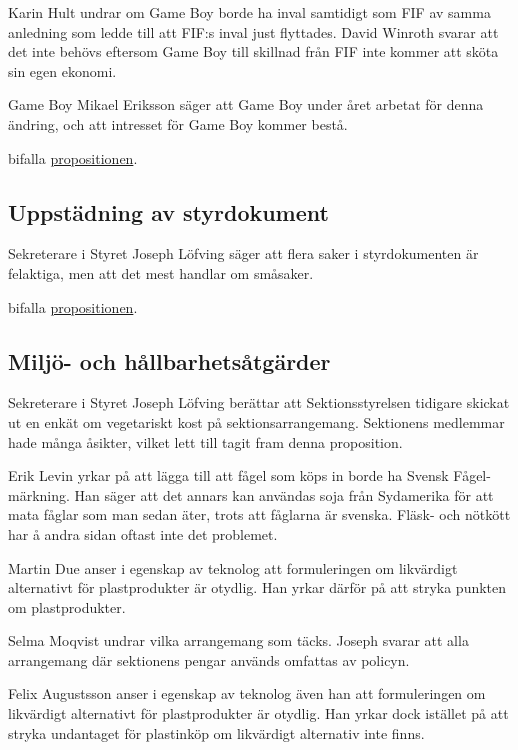 \documentclass[hidelinks]{sektionsmote}
\begin{document}
Karin Hult undrar om Game Boy borde ha inval samtidigt som FIF av samma anledning som ledde till att FIF:s inval just flyttades.
David Winroth svarar att det inte behövs eftersom Game Boy till skillnad från FIF inte kommer att sköta sin egen ekonomi.

Game Boy Mikael Eriksson säger att Game Boy under året arbetat för denna ändring, och att intresset för Game Boy kommer bestå.

\begin{beslut}
  \item bifalla \hyperlink{bilagor/prop/b.pdf.1}{propositionen}.
\end{beslut}


\subsection{Uppstädning av styrdokument}
Sekreterare i Styret Joseph Löfving säger att flera saker i styrdokumenten är felaktiga, men att det mest handlar om småsaker.

\begin{beslut}
  \item bifalla \hyperlink{bilagor/prop/c.pdf.1}{propositionen}.
\end{beslut}


\subsection{Miljö- och hållbarhetsåtgärder}
Sekreterare i Styret Joseph Löfving berättar att Sektionsstyrelsen tidigare skickat ut en enkät om vegetariskt kost på sektionsarrangemang.
Sektionens medlemmar hade många åsikter, vilket lett till tagit fram denna proposition.

Erik Levin yrkar på att lägga till att fågel som köps in borde ha Svensk Fågel-märkning.
Han säger att det annars kan användas soja från Sydamerika för att mata fåglar som man sedan äter, trots att fåglarna är svenska.
Fläsk- och nötkött har å andra sidan oftast inte det problemet.

Martin Due anser i egenskap av teknolog att formuleringen om likvärdigt alternativt för plastprodukter är otydlig.
Han yrkar därför på att stryka punkten om plastprodukter.

Selma Moqvist undrar vilka arrangemang som täcks.
Joseph svarar att alla arrangemang där sektionens pengar används omfattas av policyn.

Felix Augustsson anser i egenskap av teknolog även han att formuleringen om likvärdigt alternativt för plastprodukter är otydlig.
Han yrkar dock istället på att stryka undantaget för plastinköp om likvärdigt alternativ inte finns.
\end{document}
